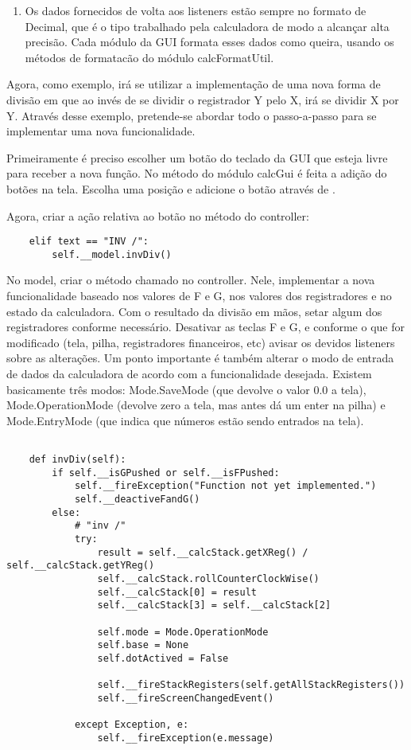 \begin{enumerate}
\item Os dados fornecidos de volta aos listeners estão sempre no formato de Decimal, que é o tipo trabalhado pela 
calculadora de modo a alcançar alta precisão. Cada módulo da GUI formata esses dados como queira, usando os métodos 
de formatacão do módulo calcFormatUtil.

\end{enumerate}

Agora, como exemplo, irá se utilizar a implementação de uma nova forma de divisão em que ao invés de se dividir o 
registrador Y pelo X, irá se dividir X por Y. Através desse exemplo, pretende-se abordar todo o passo-a-passo para se 
implementar uma nova funcionalidade.

Primeiramente é preciso escolher um botão do teclado da GUI que esteja livre para receber a nova função. 
No método %
 do módulo calcGui é feita a adição do botões na tela. Escolha uma posição e adicione o 
botão através de %
.

Agora, criar a ação relativa ao botão no método %
do controller: 

\begin{verbatim}
	elif text == "INV /":
 		self.__model.invDiv()
\end{verbatim}

No model, criar o método chamado no controller. Nele, implementar a nova funcionalidade baseado nos valores de 
F e G, nos valores dos registradores e no estado da calculadora. Com o resultado da divisão em mãos, setar algum dos 
registradores conforme necessário. Desativar as teclas F e G, e conforme o que for modificado (tela, pilha, registradores 
financeiros, etc) avisar os devidos listeners sobre as alterações. Um ponto importante é também alterar o modo de 
entrada de dados da calculadora de acordo com a funcionalidade desejada. Existem basicamente três modos: 
Mode.SaveMode (que devolve o valor 0.0 a tela), Mode.OperationMode (devolve zero a tela, mas antes dá um enter na pilha) 
e Mode.EntryMode (que indica que números estão sendo entrados na tela).
\begin{verbatim}

    def invDiv(self):
        if self.__isGPushed or self.__isFPushed:
            self.__fireException("Function not yet implemented.")
            self.__deactiveFandG()
        else:
            # "inv /"
            try:
                result = self.__calcStack.getXReg() / self.__calcStack.getYReg()
                self.__calcStack.rollCounterClockWise()
                self.__calcStack[0] = result
                self.__calcStack[3] = self.__calcStack[2]
        
                self.mode = Mode.OperationMode
                self.base = None
                self.dotActived = False
        
                self.__fireStackRegisters(self.getAllStackRegisters())
                self.__fireScreenChangedEvent()
                 
            except Exception, e:
                self.__fireException(e.message)
\end{verbatim}
